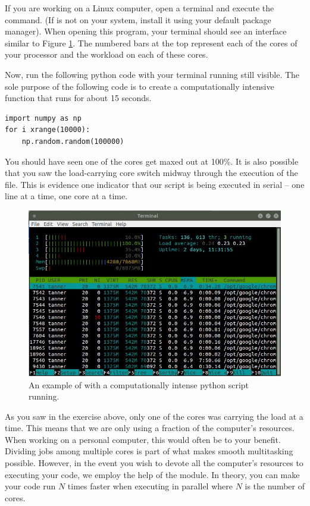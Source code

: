 \begin{problem}
If you are working on a Linux computer, open a terminal and execute the  command. (If  is not on your system, install it using your default package manager). When opening this program, your terminal should see an interface similar to Figure \ref{fig:htop}. The numbered bars at the top represent each of the cores of your processor and the workload on each of these cores.

Now, run the following python code with your terminal running  still visible. The sole purpose of the following code is to create a computationally intensive function that runs for about 15 seconds.

\begin{lstlisting}
import numpy as np
for i xrange(10000):
    np.random.random(100000)
\end{lstlisting}

You should have seen one of the cores get maxed out at 100\%. It is also possible that you saw the load-carrying core switch midway through the execution of the file. This is evidence one indicator that our script is being executed in serial -- one line at a time, one core at a time.
\end{problem}

\begin{figure}
    \includegraphics[width=\textwidth]{active.jpg}
\caption{An example of  with a computationally intense python script running.}
\label{fig:htop}
\end{figure}

As you saw in the exercise above, only one of the cores was carrying the load at a time. This means that we are only using a fraction of the computer's resources. When working on a personal computer, this would often be to your benefit. Dividing jobs among multiple cores is part of what makes smooth multitasking possible. However, in the event you wish to devote all the computer's resources to executing your code, we employ the help of the  module. In theory, you can make your code run $N$ times faster when executing in parallel where $N$ is the number of cores.

